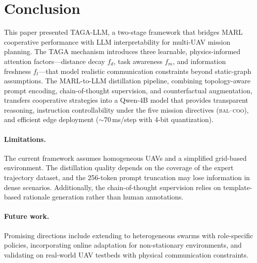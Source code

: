 
\section{Conclusion}
\label{sec:conclusion}

This paper presented TAGA-LLM, a two-stage framework that bridges MARL cooperative
performance with LLM interpretability for multi-UAV mission planning.  The TAGA
mechanism introduces three learnable, physics-informed attention
factors---distance decay $f_d$, task awareness $f_m$, and information freshness
$f_t$---that model realistic communication constraints beyond static-graph
assumptions.  The MARL-to-LLM distillation pipeline, combining topology-aware
prompt encoding, chain-of-thought supervision, and counterfactual augmentation,
transfers cooperative strategies into a Qwen-4B model that provides transparent
reasoning, instruction controllability under the five mission directives
(\textsc{bal}--\textsc{coo}), and efficient edge deployment
(${\sim}70$\,ms/step with 4-bit quantization).

\paragraph{Limitations.}
The current framework assumes homogeneous UAVs and a simplified grid-based
environment.  The distillation quality depends on the coverage of the expert
trajectory dataset, and the 256-token prompt truncation may lose information in
dense scenarios.  Additionally, the chain-of-thought supervision relies on
template-based rationale generation rather than human annotations.

\paragraph{Future work.}
Promising directions include extending to heterogeneous swarms with
role-specific policies, incorporating online adaptation for non-stationary
environments, and validating on real-world UAV testbeds with physical
communication constraints.
